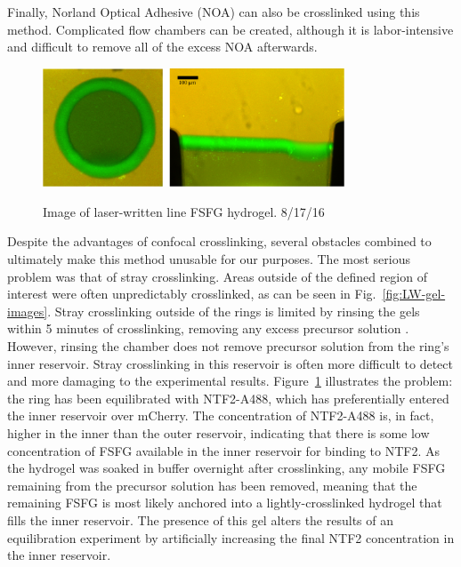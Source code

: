 Finally, Norland Optical Adhesive (NOA) can also be crosslinked using this method.  Complicated flow chambers can be created, although it is labor-intensive and difficult to remove all of the excess NOA afterwards.

\begin{figure} %
\caption{Image of laser-written line FSFG hydrogel. 8/17/16}
\centering
\includegraphics[width=0.8\textwidth]{figs/ch03/example-LW-gels-NTF2}
\label{fig:LW-NTF2-images}
\end{figure} %

Despite the advantages of confocal crosslinking, several obstacles combined to ultimately make this method unusable for our purposes.  The most serious problem was that of stray crosslinking.  Areas outside of the defined region of interest were often unpredictably crosslinked, as can be seen in Fig.~\ref{fig:LW-gel-images}.  Stray crosslinking outside of the rings is limited by rinsing the gels within 5 minutes of crosslinking, removing any excess precursor solution \cite{paustian13}.  However, rinsing the chamber does not remove precursor solution from the ring's inner reservoir.  Stray crosslinking in this reservoir is often more difficult to detect and more damaging to the experimental results. Figure~\ref{fig:LW-NTF2-images} illustrates the problem: the ring has been equilibrated with NTF2-A488, which has preferentially entered the inner reservoir over mCherry.  The concentration of NTF2-A488 is, in fact, higher in the inner than the outer reservoir, indicating that there is some low concentration of FSFG available in the inner reservoir for binding to NTF2.  As the hydrogel was soaked in buffer overnight after crosslinking, any mobile FSFG remaining from the precursor solution has been removed, meaning that the remaining FSFG is most likely anchored into a lightly-crosslinked hydrogel that fills the inner reservoir.  The presence of this gel alters the results of an equilibration experiment by artificially increasing the final NTF2 concentration in the inner reservoir.

